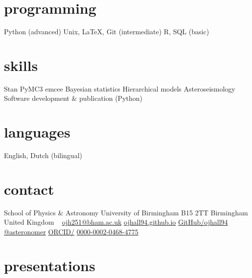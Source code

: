 \documentclass[]{k-cv} %
\begin{document}


\begin{aside} %
\section{programming}
\bodyfont Python (advanced)
Unix, LaTeX, Git (intermediate)
R, SQL (basic)
\section{skills}
Stan
PyMC3
emcee 
Bayesian statistics
Hierarchical models
Asteroseismology
Software development \& publication (Python)
\section{languages}
English, Dutch (bilingual)
\section{contact}
School of Physics \& Astronomy
University of Birmingham
B15 2TT
Birmingham
United Kingdom
~
\href{mailto:ojh251@student.bham.ac.uk}{ojh251@bham.ac.uk}
\href{http://www.ojhall94.github.io}{ojhall94.github.io}
\href{http://www.github.com/ojhall94}{GitHub/ojhall94}
\href{http://www.twitter.com/asteronomer}{@asteronomer}
\href{http://www.orcid.com/0000-0002-0468-4775}{ORCID/}
\href{http://www.orcid.com/0000-0002-0468-4775}{0000-0002-0468-4775}
\end{aside}

\section{presentations}
\end{document}

